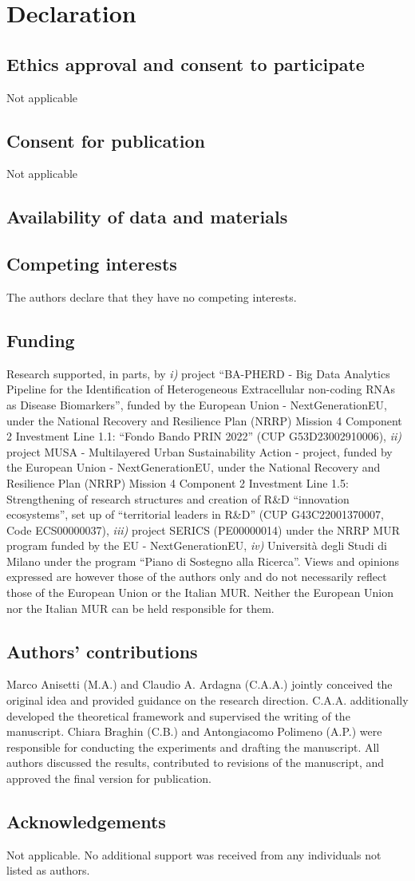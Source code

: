 \section{Declaration}
\subsection{Ethics approval and consent to participate}
Not applicable
\subsection{Consent for publication}
Not applicable
\subsection{Availability of data and materials}
\subsection{Competing interests}
The authors declare that they have no competing interests.
\subsection{Funding}
Research supported, in parts, by \emph{i)} project ``BA-PHERD - Big Data Analytics Pipeline for the Identification of Heterogeneous Extracellular non-coding RNAs as Disease Biomarkers'', funded by the European Union - NextGenerationEU, under the National Recovery and Resilience Plan (NRRP) Mission 4 Component 2 Investment Line 1.1: “Fondo Bando PRIN 2022” (CUP G53D23002910006), \emph{ii)} project MUSA - Multilayered Urban Sustainability Action - project, funded by the European Union - NextGenerationEU, under the National Recovery and Resilience Plan (NRRP) Mission 4 Component 2 Investment Line 1.5: Strengthening of research structures and creation of R\&D ``innovation ecosystems'', set up of ``territorial leaders in R\&D'' (CUP  G43C22001370007, Code ECS00000037), \emph{iii)} project SERICS (PE00000014) under the NRRP MUR program funded by the EU - NextGenerationEU, \emph{iv)} Università degli Studi di Milano under the program ``Piano di Sostegno alla Ricerca''. Views and opinions expressed are however those of the authors only and do not necessarily reflect those of the European Union or the Italian MUR. Neither the European Union nor the Italian MUR can be held responsible for them.
\subsection{Authors' contributions}
Marco Anisetti (M.A.) and Claudio A. Ardagna (C.A.A.) jointly conceived the original idea and provided guidance on the research direction. C.A.A. additionally developed the theoretical framework and supervised the writing of the manuscript. Chiara Braghin (C.B.) and Antongiacomo Polimeno (A.P.) were responsible for conducting the experiments and drafting the manuscript. All authors discussed the results, contributed to revisions of the manuscript, and approved the final version for publication.
\subsection{Acknowledgements}
Not applicable. No additional support was received from any individuals not listed as authors.